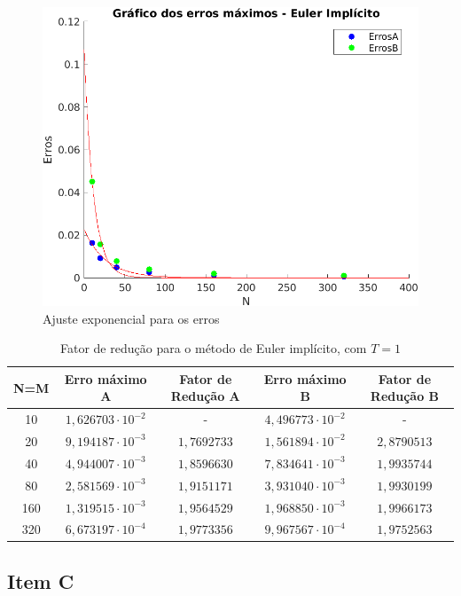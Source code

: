 \documentclass[12pt]{article}
\begin{document}
\begin{spacing}{1.5}
\begin{figure}[ht!]
    \centering
    \includegraphics[width=0.65\linewidth]{Segunda_Tarefa/ItemB/erro_euler.png}
    \caption{Ajuste exponencial para os erros}
    \label{fig:2B_Fit_Erro}
\end{figure} 
\vspace{0.5cm}
\begin{table}[ht]
\centering 
\begin{tabular}{c c c c c} 
\hline\hline 
\rule{0pt}{3ex} 
N=M & Erro máximo A & Fator de Redução A & Erro máximo B & Fator de Redução B\\ [0.5ex] 
\hline 
\rule{0pt}{4ex}
        10  & $1,626703 \cdot 10^{-2}$ &      -        & $4,496773 \cdot 10^{-2}$ &       -      \\ 
        20  & $9,194187 \cdot 10^{-3}$ &  $1,7692733$  & $1,561894 \cdot 10^{-2}$ &  $2,8790513$ \\ 
        40  & $4,944007 \cdot 10^{-3}$ &  $1,8596630$  & $7,834641 \cdot 10^{-3}$ &  $1,9935744$ \\ 
        80  & $2,581569 \cdot 10^{-3}$ &  $1,9151171$  & $3,931040 \cdot 10^{-3}$ &  $1,9930199$ \\ 
        160 & $1,319515 \cdot 10^{-3}$ &  $1,9564529$  & $1,968850 \cdot 10^{-3}$ &  $1,9966173$ \\ 
        320 & $6,673197 \cdot 10^{-4}$ &  $1,9773356$  & $9,967567 \cdot 10^{-4}$ &  $1,9752563$ \\ [1ex]
\hline
\end{tabular}
\caption{Fator de redução para o método de Euler implícito, com $T = 1$} 
\label{table:fator_reducao}
\end{table}

\subsection{Item C}


\end{spacing}
\end{document}
